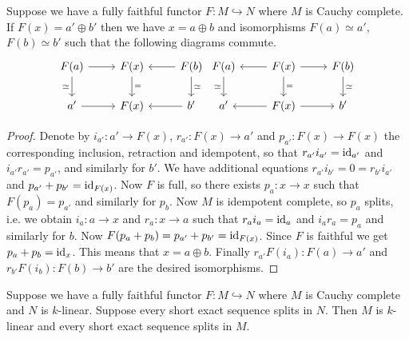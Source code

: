 \begin{lemma}\label{direct_sum}
  Suppose we have a fully faithful functor $F:M\hookrightarrow N$ where $M$ is
  Cauchy complete. If $F(x)=a'\oplus b'$ then we have $x=a\oplus b$ and
  isomorphisms $F(a)\simeq a'$, $F(b)\simeq b'$ such that the following
  diagrams commute.
  \[
    \begin{tikzcd}
      {F(a)} & {F(x)} & {F(b)} \\
      {a'} & {F(x)} & {b'}
      \arrow[from=1-1, to=1-2]
      \arrow["\simeq"', from=1-1, to=2-1]
      \arrow["{=}", from=1-2, to=2-2]
      \arrow[from=1-3, to=1-2]
      \arrow["\simeq", from=1-3, to=2-3]
      \arrow[from=2-1, to=2-2]
      \arrow[from=2-3, to=2-2]
    \end{tikzcd} \begin{tikzcd}
      {F(a)} & {F(x)} & {F(b)} \\
      {a'} & {F(x)} & {b'}
      \arrow["\simeq"', from=1-1, to=2-1]
      \arrow[from=1-2, to=1-1]
      \arrow[from=1-2, to=1-3]
      \arrow["{=}", from=1-2, to=2-2]
      \arrow["\simeq", from=1-3, to=2-3]
      \arrow[from=2-2, to=2-1]
      \arrow[from=2-2, to=2-3]
    \end{tikzcd}
  \]
\end{lemma}

\begin{proof}
  \noindent
  Denote by $i_{a'}:a'\to F(x)$, $r_{a'}:F(x)\to a'$ and $p_{a'}:F(x)\to F(x)$
  the corresponding inclusion, retraction and idempotent, so that
  $r_{a'}i_{a'}=\operatorname{id}_{a'}$ and $i_{a'} r_{a'}=p_{a'}$, and similarly for $b'$.
  We have additional equations $r_{a'}i_{b'}=0=r_{b'}i_{a'}$ and
  $p_{a'}+p_{b'}=\operatorname{id}_{F(x)}$. Now $F$ is full, so there exists $p_a:x\to x$
  such that $F(p_a)=p_{a'}$ and similarly for $p_b$. Now $M$ is idempotent
  complete, so $p_a$ splits, i.e. we obtain $i_a:a\to x$ and $r_a:x\to a$ such
  that $r_a i_a=\operatorname{id}_a$ and $i_a r_a=p_a$ and similarly for $b$. Now
  $F(p_a+p_b)=p_{a'}+p_{b'}=\operatorname{id}_{F(x)}$. Since $F$ is faithful we get
  $p_a+p_b=\operatorname{id}_x$. This means that $x=a\oplus b$. Finally
  $r_{a'}F(i_a):F(a)\to a'$ and $r_{b'}F(i_b):F(b)\to b'$ are the desired
  isomorphisms.
\end{proof}

\begin{lemma}\label{abelian}
  Suppose we have a fully faithful functor $F:M\hookrightarrow N$ where $M$ is
  Cauchy complete and $N$ is $k$-linear. Suppose every short exact sequence
  splits in $N$. Then $M$ is $k$-linear and every short exact sequence splits
  in $M$.
\end{lemma}


